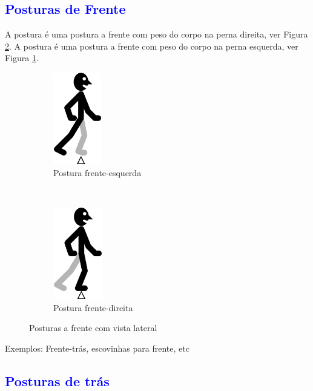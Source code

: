 \subsection{\textcolor{blue}{ Posturas de Frente }}

A postura  é uma postura a frente com peso do corpo na perna direita, ver Figura \ref{fig:frentedireita}.
A postura  é uma postura a frente com peso do corpo na perna esquerda, ver Figura \ref{fig:frenteesquerda}.
\begin{figure}[H]
    \centering
    \begin{subfigure}[b]{0.3\textwidth}
        \includegraphics[height=4cm]{chapters/cap-posturas/postura-ft-frente-esq.eps}
        \caption{Postura frente-esquerda}
        \label{fig:frenteesquerda}
    \end{subfigure}
    ~ %
    \begin{subfigure}[b]{0.3\textwidth}
        \includegraphics[height=4cm]{chapters/cap-posturas/postura-ft-frente-der.eps}
        \caption{Postura frente-direita}
        \label{fig:frentedireita}
    \end{subfigure}      
    \caption{Posturas a frente  com vista lateral}\label{fig:frentederesq}
\end{figure}

Exemplos: Frente-trás, escovinhas para frente, etc


\subsection{\textcolor{blue}{ Posturas de  trás}}



